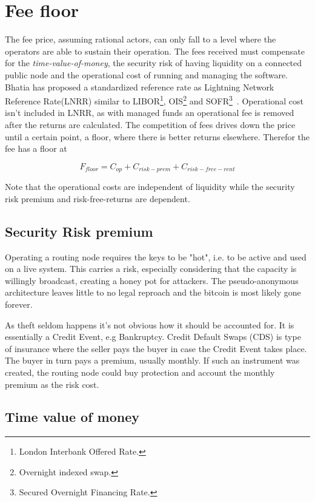 \section{Fee floor}

The fee price, assuming rational actors, can only fall to a level where the operators are able to sustain their operation. The fees received must compensate for the \textit{time-value-of-money}, the security risk of having liquidity on a connected public \gls{node} and the operational cost of running and managing the software. Bhatia has proposed a standardized reference rate as Lightning Network Reference Rate(LNRR) similar to LIBOR\footnote{London Interbank Offered Rate.}, OIS\footnote{Overnight indexed swap.} and SOFR\footnote{Secured Overnight Financing Rate.}~\cite{bhatia:time:value}. Operational cost isn't included in LNRR, as with managed funds an operational fee is removed after the returns are calculated. The competition of fees drives down the price until a certain point, a floor, where there is better returns elsewhere. Therefor the fee has a floor at

\[ F_{floor} = C_{op} + C_{risk-prem} + C_{risk-free-rent} \]

Note that the operational costs are independent of liquidity while the security risk premium and risk-free-returns are dependent.

\subsection{Security Risk premium}

Operating a routing node requires the keys to be "hot", i.e. to be active and used on a live system. This carries a risk, especially considering that the capacity is willingly broadcast, creating a honey pot for attackers. The pseudo-anonymous architecture leaves little to no legal reproach and the bitcoin is most likely gone forever.

As theft seldom happens it's not obvious how it should be accounted for. It is essentially a Credit Event, e.g Bankruptcy. Credit Default Swaps (CDS) is type of  insurance where the seller pays the buyer in case the Credit Event takes place. The buyer in turn pays a premium, usually monthly. If such an instrument was created, the routing node could buy protection and account the monthly premium as the risk cost. 

\subsection{Time value of money}

